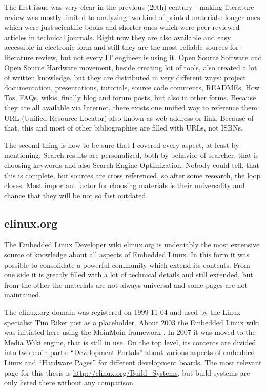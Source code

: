 \documentclass[printmode]{mgr}
\begin{document}
The first issue was very clear in the previous (20th) century - making literature review was mostly limited to analyzing two kind of printed materials: longer ones which were just scientific books and shorter ones which were peer reviewed articles in technical journals.
Right now they are also available and easy accessible in electronic form and still they are the most reliable sources for literature review, but not every IT engineer is using it.
Open Source Software and Open Source Hardware movement, beside creating lot of tools, also created a lot of written knowledge, but they are distributed in very different ways: project documentation, presentations, tutorials, source code comments, READMEs, How Tos, FAQs, wikis, finally blog and forum posts, but also in other forms.
Because they are all available via Internet, there exists one unified way to reference them: URL (Unified Resource Locator) also known as web address or link.
Because of that, this and most of other bibliographies are filled with URLs, not ISBNs.

The second thing is how to be sure that I covered every aspect, at least by mentioning. Search results are personalized, both by behavior of searcher, that is choosing keywords and also Search Engine Optimization.
Nobody could tell, that this is complete, but sources are cross referenced, so after some research, the loop closes.
Most important factor for choosing materials is their universality and chance that they will be not so fast outdated.

\subsection*{elinux.org}

The Embedded Linux Developer wiki elinux.org is undeniably the most extensive source of knowledge about all aspects of Embedded Linux.
In this form it was possible to consolidate a powerful community which extend its contents.
From one side it is greatly filled with a lot of technical details and still extended, but from the other the materials are not always universal and some pages are not maintained.

The elinux.org domain was registered on 1999-11-04 \cite{web:whois-elinux} and used by the Linux specialist Tim Riker just as a placeholder.\cite{web:riker}\cite{web:elinux-placeholder}
About 2003 the Embedded Linux wiki was initiated here using the MoinMoin framework \cite{web:elinux-moinmoin}.
In 2007 it was moved to the Media Wiki engine, that is still in use.
On the top level, its contents are divided into two main parts: ``Development Portals'' about various aspects of embedded Linux and ``Hardware Pages'' for different development boards.
The most relevant page for this thesis is \url{http://elinux.org/Build_Systems}, but build systems are only listed there without any comparison.
\end{document}

